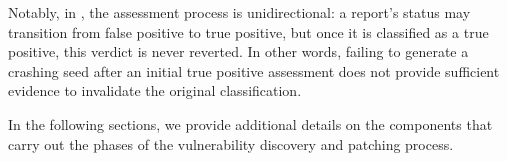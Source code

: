 Notably, in \artiphishell, the assessment process is unidirectional: a report’s status may transition from false positive to true positive, but once it is classified as a true positive, this verdict is never reverted. In other words, failing to generate a crashing seed after an initial true positive assessment does not provide sufficient evidence to invalidate the original classification.



\medskip

In the following sections, we provide additional details on the components that carry out the phases of the vulnerability discovery and patching process.